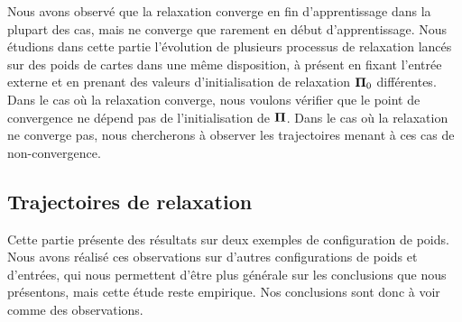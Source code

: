 \documentclass[../main]{subfiles}
\begin{document}
Nous avons observé que la relaxation converge en fin d'apprentissage dans la plupart des cas, mais ne converge que rarement en début d'apprentissage.
Nous étudions dans cette partie l'évolution de plusieurs processus de relaxation lancés sur des poids de cartes dans une même disposition, à présent en fixant l'entrée externe et en prenant des valeurs d'initialisation de relaxation $\mathbf{\Pi}_0$ différentes.
Dans le cas où la relaxation converge, nous voulons vérifier que le point de convergence ne dépend pas de l'initialisation de $\mathbf{\Pi}$.
Dans le cas où la relaxation ne converge pas, nous chercherons à observer les trajectoires menant à ces cas de non-convergence.

\subsection{Trajectoires de relaxation\label{sec:relax_expe}}

Cette partie présente des résultats sur deux exemples de configuration de poids. Nous avons réalisé ces observations sur d'autres configurations de poids et d'entrées, qui nous permettent d'être plus générale sur les conclusions que nous présentons, mais cette étude reste empirique. Nos conclusions sont donc à voir comme des observations.
\end{document}
